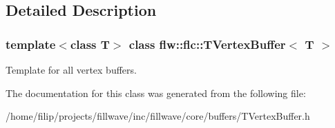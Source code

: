 \subsection{Detailed Description}
\subsubsection*{template$<$class T$>$\newline
class flw\+::flc\+::\+T\+Vertex\+Buffer$<$ T $>$}

Template for all vertex buffers. 

The documentation for this class was generated from the following file\+:\begin{DoxyCompactItemize}
\item 
/home/filip/projects/fillwave/inc/fillwave/core/buffers/T\+Vertex\+Buffer.\+h\end{DoxyCompactItemize}
